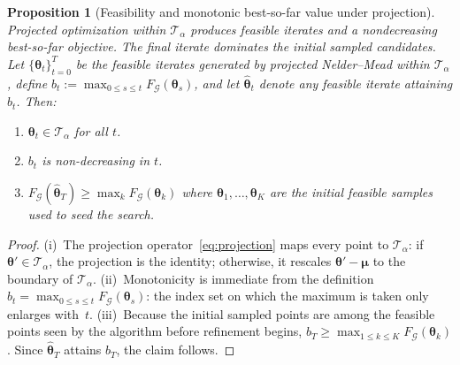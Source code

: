 \documentclass[aps,prx,reprint,superscriptaddress,longbibliography]{revtex4-2}
\newcommand{\calG}{\mathcal{G}}
\newcommand{\calT}{\mathcal{T}}
\newtheorem{proposition}[theorem]{Proposition}
\begin{document}
\begin{proposition}[Feasibility and monotonic best-so-far value under projection]
\label{prop:nondeg}
Projected optimization within $\calT_\alpha$ produces feasible iterates
and a nondecreasing best-so-far objective. The final iterate dominates
the initial sampled candidates. Let $\{\bm\theta_t\}_{t=0}^T$ be the
feasible iterates generated by projected Nelder--Mead within
$\calT_\alpha$, define $b_t := \max_{0 \le s \le t} F_\calG(\bm\theta_s)$,
and let $\widehat{\bm\theta}_t$ denote any feasible iterate attaining
$b_t$. Then:
\begin{enumerate}[label=(\roman*)]
\item $\bm\theta_t \in \calT_\alpha$ for all $t$.
\item $b_t$ is non-decreasing in $t$.
\item $F_\calG(\widehat{\bm\theta}_T) \ge \max_k F_\calG(\bm\theta_k)$
where $\bm\theta_1,\ldots,\bm\theta_K$ are the initial feasible samples
used to seed the search.
\end{enumerate}
\end{proposition}

\begin{proof}
(i)~The projection operator~\cref{eq:projection} maps every point
to $\calT_\alpha$: if $\bm\theta' \in \calT_\alpha$, the projection
is the identity; otherwise, it rescales
$\bm\theta' - \bm\mu$ to the boundary of $\calT_\alpha$.
(ii)~Monotonicity is immediate from the definition
$b_t = \max_{0 \le s \le t} F_\calG(\bm\theta_s)$: the index set on
which the maximum is taken only enlarges with~$t$.
(iii)~Because the initial sampled points are among the feasible points
seen by the algorithm before refinement begins,
$b_T \ge \max_{1 \le k \le K} F_\calG(\bm\theta_k)$. Since
$\widehat{\bm\theta}_T$ attains $b_T$, the claim follows.
\end{proof}
\end{document}
